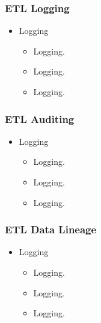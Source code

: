 \begin{frame}
\frametitle{ETL Logging}
\begin{itemize}[<+->]
	\item Logging
	\begin{itemize}[<+->]
		\item  Logging.
		\item  Logging.
		\item  Logging.
		

	\end{itemize}
\end{itemize}
\end{frame}


\begin{frame}
\frametitle{ETL Auditing}
\begin{itemize}[<+->]
	\item Logging
	\begin{itemize}[<+->]
		\item  Logging.
		\item  Logging.
		\item  Logging.
		
		
	\end{itemize}
\end{itemize}
\end{frame}


\begin{frame}
\frametitle{ETL Data Lineage}
\begin{itemize}[<+->]
	\item Logging
	\begin{itemize}[<+->]
		\item  Logging.
		\item  Logging.
		\item  Logging.
		
		
	\end{itemize}
\end{itemize}
\end{frame}


